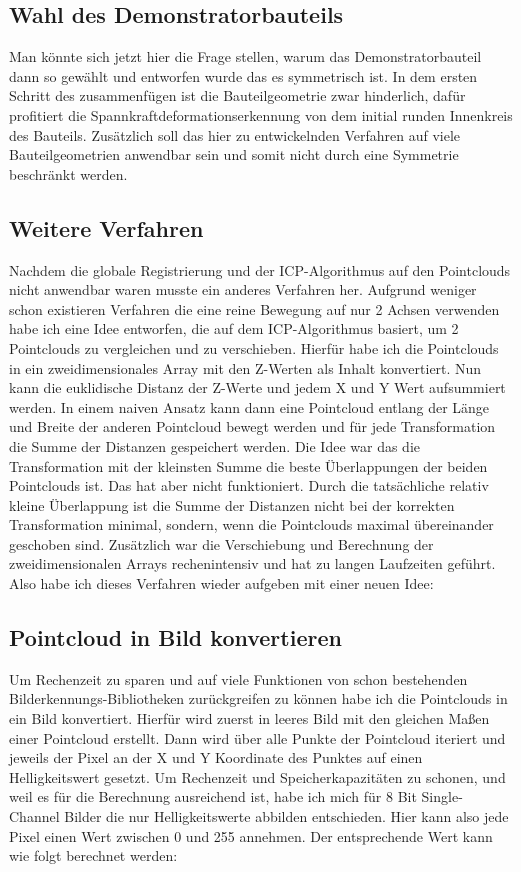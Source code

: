 \documentclass[../main.tex]{subfiles}
\begin{document}
\newpage

\subsection*{Wahl des Demonstratorbauteils}

Man könnte sich jetzt hier die Frage stellen, warum das Demonstratorbauteil dann so gewählt 
und entworfen wurde das es symmetrisch ist. In dem ersten Schritt des zusammenfügen ist 
die Bauteilgeometrie zwar hinderlich, dafür profitiert die 
Spannkraftdeformationserkennung von dem initial runden Innenkreis des Bauteils.
Zusätzlich soll das hier zu entwickelnden Verfahren auf viele Bauteilgeometrien 
anwendbar sein und somit nicht durch eine Symmetrie beschränkt werden.

\subsection*{Weitere Verfahren}

Nachdem die globale Registrierung und der ICP-Algorithmus auf den Pointclouds nicht
anwendbar waren musste ein anderes Verfahren her. Aufgrund weniger schon existieren 
Verfahren die eine reine Bewegung auf nur 2 Achsen verwenden habe ich eine Idee 
entworfen, die auf dem ICP-Algorithmus basiert, um 2 Pointclouds zu vergleichen 
und zu verschieben. Hierfür habe ich die Pointclouds in ein zweidimensionales Array
mit den Z-Werten als Inhalt konvertiert. Nun kann die euklidische Distanz der Z-Werte
und jedem X und Y Wert aufsummiert werden. In einem naiven Ansatz kann dann eine 
Pointcloud entlang der Länge und Breite der anderen Pointcloud bewegt werden und für 
jede Transformation die Summe der Distanzen gespeichert werden. Die Idee war das die 
Transformation mit der kleinsten Summe die beste Überlappungen der beiden Pointclouds 
ist. Das hat aber nicht funktioniert. Durch die tatsächliche relativ kleine Überlappung 
ist die Summe der Distanzen nicht bei der korrekten Transformation minimal, 
sondern, wenn die Pointclouds maximal übereinander geschoben sind. Zusätzlich war die 
Verschiebung und Berechnung der zweidimensionalen Arrays rechenintensiv und hat zu 
langen Laufzeiten geführt. Also habe ich dieses Verfahren wieder aufgeben mit einer neuen
Idee:

\newpage

\subsection*{Pointcloud in Bild konvertieren}
Um Rechenzeit zu sparen und auf viele Funktionen von schon bestehenden 
Bilderkennungs-Bibliotheken zurückgreifen zu können habe ich die Pointclouds in ein
Bild konvertiert. Hierfür wird zuerst in leeres Bild mit den gleichen Maßen einer 
Pointcloud erstellt. Dann wird über alle Punkte der Pointcloud iteriert und jeweils
der Pixel an der X und Y Koordinate des Punktes auf einen Helligkeitswert gesetzt.
Um Rechenzeit und Speicherkapazitäten zu schonen, und weil es für die Berechnung 
ausreichend ist, habe ich mich für 8 Bit Single-Channel Bilder die nur Helligkeitswerte 
abbilden entschieden. Hier kann also jede Pixel einen Wert zwischen 0 und 255 annehmen.
Der entsprechende Wert kann wie folgt berechnet werden:
\end{document}
